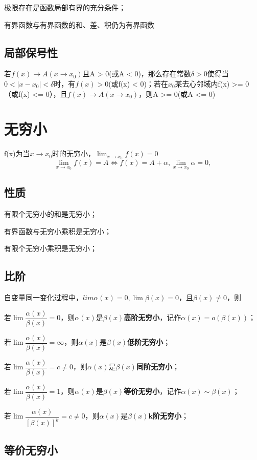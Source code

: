 极限存在是函数局部有界的充分条件；

有界函数与有界函数的和、差、积仍为有界函数


\subsection{局部保号性}
若\(f(x) \to A(x \to x_0)\)且A > 0(或A < 0)，那么存在常数\(\delta > 0\)使得当\(0 < |x - x_0| < \delta\)时，有\(f(x) > 0\)(或f(x) < 0)；若在\(x_0\)某去心邻域内f(x) >= 0（或f(x) <= 0），且\(f(x) \to A(x \to x_0)\)，则A >= 0(或A <= 0)


\section{无穷小}
f(x)为当\(x \to x_0\)时的无穷小，\(\displaystyle \lim_{x \to x_0}f(x) = 0\)
\[\lim_{x \to x_0}f(x) = A \Leftrightarrow f(x) = A + \alpha,\lim_{x \to x_0}\alpha = 0,\]

\subsection{性质}
有限个无穷小的和是无穷小；

有界函数与无穷小乘积是无穷小；

有限个无穷小乘积是无穷小；


\subsection{比阶}
自变量同一变化过程中，\(lim\alpha(x) = 0, \lim\beta(x) = 0\)，且\(\beta(x) \neq 0\)，则

若\(\lim\dfrac{\alpha(x)}{\beta(x)} = 0\)，则\(\alpha(x)\)是\(\beta(x)\)\textbf{高阶无穷小}，记作\(\alpha(x) = o(\beta(x))\)；

若\(\lim\dfrac{\alpha(x)}{\beta(x)} = \infty\)，则\(\alpha(x)\)是\(\beta(x)\)\textbf{低阶无穷小}；

若\(\lim\dfrac{\alpha(x)}{\beta(x)} = c \neq 0\)，则\(\alpha(x)\)是\(\beta(x)\)\textbf{同阶无穷小}；

若\(\lim\dfrac{\alpha(x)}{\beta(x)} = 1\)，则\(\alpha(x)\)是\(\beta(x)\)\textbf{等价无穷小}，记作\(\alpha(x) \sim \beta(x)\)；

若\(\lim\dfrac{\alpha(x)}{[\beta(x)]^k} = c \neq 0\)，则\(\alpha(x)\)是\(\beta(x)\)\textbf{k阶无穷小}；

\subsection{等价无穷小}

